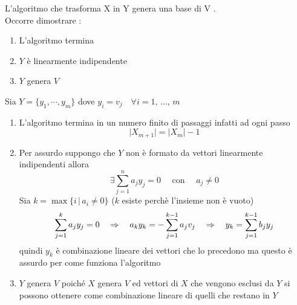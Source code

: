 \begin{lem} L'algoritmo che trasforma X in Y genera una base di V .\\
Occorre dimostrare :
 \begin{enumerate}
\item L'algoritmo termina
\item$Y$ è linearmente indipendente
\item $Y$ genera $V$
\end{enumerate}

\proof \bianco Sia $ Y=\{ y_1,\cdots , y_m \}$ dove $y_i = v_j  \quad \forall i =1 , \, \dots , \, m $
\begin{enumerate}
\item L'algoritmo termina in un numero finito di passaggi infatti ad ogni passo $$\vert X_{m+1} \vert = \vert X_m \vert - 1 $$
\item Per assurdo suppongo che $Y$ non è formato da vettori linearmente indipendenti allora  $$\exists \sum_{j=1}^n a_j y_j =0 \quad \text{ con } \quad a_j \neq 0$$
Sia $k = \max \{ i \, \vert \,  a_i \neq 0 \} $ ($k$ esiste perch\`e l'insieme non \`e vuoto)
 $$
\sum_{j=1}	^k a_j y_j =0 \quad \Rightarrow \quad 
a_k y_k=-\sum_{j=1}^{k-1} a_j v_j \quad \Rightarrow \quad 
y_k=\sum_{j=1}^{k-1} b_j y_j
$$
quindi $y_k$ è combinazione lineare dei vettori che lo precedono ma questo è assurdo  per come funziona l'algoritmo 
\item 
$Y$ genera $V$ poiché $X$ genera $V$  ed  vettori di $X$ che vengono esclusi da $Y$ si possono ottenere come combinazione lineare di quelli che restano in $Y$
\end{enumerate}

\endproof
\end{lem}

